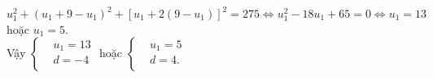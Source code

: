\begin{bt}
{\begin{enumerate}[a)]
			$u_1^2+{(u_1+9-u_1)}^2+{\left[u_1+2(9-u_1)\right]}^2=275 \Leftrightarrow u_1^2-18u_1+65=0 \Leftrightarrow u_1=13$ hoặc $u_1=5$. \\
			Vậy $\left\{\begin{aligned} 
				&u_1=13 \\
				&d=-4 \\
			\end{aligned}\right. $ hoặc $\left\{\begin{aligned} 
				&u_1=5 \\
				&d=4. \\
			\end{aligned}\right. $
		\end{enumerate}
	}
\end{bt}

